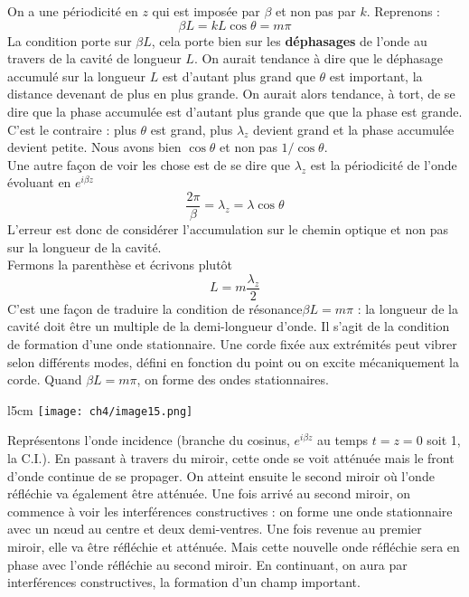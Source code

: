 On a une périodicité en $z$ qui est imposée par $\beta$ et non pas par $k$. Reprenons :
\begin{equation}
\beta L = kL\cos\theta = m\pi
\end{equation}
La condition porte sur $\beta L$, cela porte bien sur les \textbf{déphasages} de l'onde au 
travers de la cavité de longueur $L$. On aurait tendance à dire que le déphasage accumulé 
sur la longueur $L$ est d'autant plus grand que $\theta$ est important, la distance devenant 
de plus en plus grande. On aurait alors tendance, à tort, de se dire que la phase accumulée est 
d'autant plus grande que que la phase est grande. C'est le contraire : plus $\theta$ est grand, 
plus $\lambda_z$ devient grand et la phase accumulée devient petite. Nous avons bien $\cos\theta$ 
et non pas $1/\cos\theta$.\\

Une autre façon de voir les chose est de se dire que $\lambda_z$ est la périodicité de l'onde 
évoluant en $e^{i\beta z}$
\begin{equation}
\frac{2\pi}{\beta} = \lambda_z = \lambda\cos\theta
\end{equation}
L'erreur est donc de considérer l'accumulation sur le chemin optique et non pas sur la longueur 
de la cavité.\\

Fermons la parenthèse et écrivons plutôt
\begin{equation}
L = m\frac{\lambda_z}{2}
\end{equation}
C'est une façon de traduire la condition de résonance$\beta L = m\pi$ : la longueur de la cavité 
doit être un multiple de la demi-longueur d'onde. Il s'agit de la condition de formation d'une onde 
stationnaire. Une corde fixée aux extrémités peut vibrer selon différents modes, défini en fonction 
du point ou on excite mécaniquement la corde. Quand $\beta L = m\pi$, on forme des ondes stationnaires.\\

	\begin{wrapfigure}[9]{l}{5cm}
	\vspace{-5mm}
	\texttt{[image: ch4/image15.png]}
	\end{wrapfigure}
Représentons l'onde incidence (branche du cosinus, $e^{i\beta z}$ au temps $t=z=0$ soit 1, la C.I.). En 
passant à travers du miroir, cette onde se voit atténuée mais le front d'onde continue de se propager. 
On atteint ensuite le second miroir où l'onde réfléchie va également être atténuée. Une fois arrivé au 
second miroir, on commence à voir les interférences constructives : on forme une onde stationnaire avec 
un nœud au centre et deux demi-ventres. Une fois revenue au premier miroir, elle va être réfléchie et 
atténuée. Mais cette nouvelle onde réfléchie sera en phase avec l'onde réfléchie au second miroir. 
En continuant, on aura par interférences constructives, la formation d'un champ important.\\

